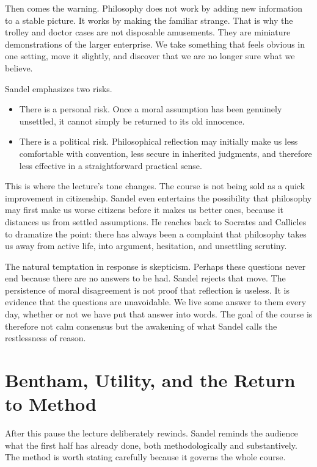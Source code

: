 Then comes the warning. Philosophy does not work by adding new information to a stable picture. It works by making the familiar strange. That is why the trolley and doctor cases are not disposable amusements. They are miniature demonstrations of the larger enterprise. We take something that feels obvious in one setting, move it slightly, and discover that we are no longer sure what we believe.

Sandel emphasizes two risks.

\begin{itemize}
\item There is a personal risk. Once a moral assumption has been genuinely unsettled, it cannot simply be returned to its old innocence.
\item There is a political risk. Philosophical reflection may initially make us less comfortable with convention, less secure in inherited judgments, and therefore less effective in a straightforward practical sense.
\end{itemize}

This is where the lecture's tone changes. The course is not being sold as a quick improvement in citizenship. Sandel even entertains the possibility that philosophy may first make us worse citizens before it makes us better ones, because it distances us from settled assumptions. He reaches back to Socrates and Callicles to dramatize the point: there has always been a complaint that philosophy takes us away from active life, into argument, hesitation, and unsettling scrutiny.

The natural temptation in response is skepticism. Perhaps these questions never end because there are no answers to be had. Sandel rejects that move. The persistence of moral disagreement is not proof that reflection is useless. It is evidence that the questions are unavoidable. We live some answer to them every day, whether or not we have put that answer into words. The goal of the course is therefore not calm consensus but the awakening of what Sandel calls the restlessness of reason.

\section{Bentham, Utility, and the Return to Method}

After this pause the lecture deliberately rewinds. Sandel reminds the audience what the first half has already done, both methodologically and substantively. The method is worth stating carefully because it governs the whole course.

